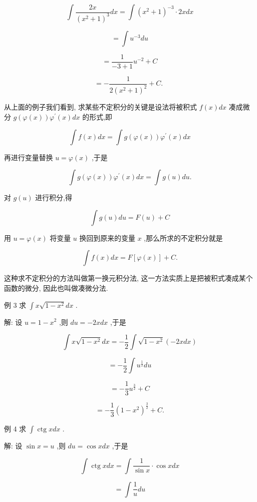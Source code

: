 \documentclass[lang=cn,newtx,10pt,scheme=chinese]{elegantbook}
\begin{document}
\[
\int \frac{2x}{{\left( {x}^{2} + 1\right) }^{3}}{dx} = \int {\left( {x}^{2} + 1\right) }^{-3} \cdot {2xdx}
\]

\[
= \int {u}^{-3}{du}
\]

\[
= \frac{1}{-3 + 1}{u}^{-2} + C
\]

\[
= - \frac{1}{2{\left( {x}^{2} + 1\right) }^{2}} + C\text{. }
\]

从上面的例子我们看到, 求某些不定积分的关键是设法将被积式 \(f\left( x\right) {dx}\) 凑成微分 \(g\left( {\varphi \left( x\right) }\right) {\varphi }^{\prime }\left( x\right) {dx}\) 的形式,即

\[
\int f\left( x\right) {dx} = \int g\left( {\varphi \left( x\right) }\right) {\varphi }^{\prime }\left( x\right) {dx}
\]

再进行变量替换 \(u = \varphi \left( x\right)\) ,于是

\[
\int g\left( {\varphi \left( x\right) }\right) {\varphi }^{\prime }\left( x\right) {dx} = \int g\left( u\right) {du}.
\]

对 \(g\left( u\right)\) 进行积分,得

\[
\int g\left( u\right) {du} = F\left( u\right) + C
\]

用 \(u = \varphi \left( x\right)\) 将变量 \(u\) 换回到原来的变量 \(x\) ,那么所求的不定积分就是

\[
\int f\left( x\right) {dx} = F\left\lbrack {\varphi \left( x\right) }\right\rbrack + C.
\]

这种求不定积分的方法叫做第一换元积分法, 这一方法实质上是把被积式凑成某个函数的微分, 因此也叫做凑微分法.

例 3 求 \(\int x\sqrt{1 - {x}^{2}}{dx}\) .

解: 设 \(u = 1 - {x}^{2}\) ,则 \({du} = - {2xdx}\) ,于是

\[
\int x\sqrt{1 - {x}^{2}}{dx} = - \frac{1}{2}\int \sqrt{1 - {x}^{2}}\left( {-{2xdx}}\right)
\]

\[
= - \frac{1}{2}\int {u}^{\frac{1}{2}}{du}
\]

\[
= - \frac{1}{3}{u}^{\frac{3}{2}} + C
\]

\[
= - \frac{1}{3}{\left( 1 - {x}^{2}\right) }^{\frac{3}{2}} + C\text{.}
\]

例 4 求 \(\int \operatorname{ctg}{xdx}\) .

解: 设 \(\sin x = u\) ,则 \({du} = \cos {xdx}\) ,于是

\[
\int \operatorname{ctg}{xdx} = \int \frac{1}{\sin x} \cdot \cos {xdx}
\]

\[
= \int \frac{1}{u}{du}
\]
\end{document}
